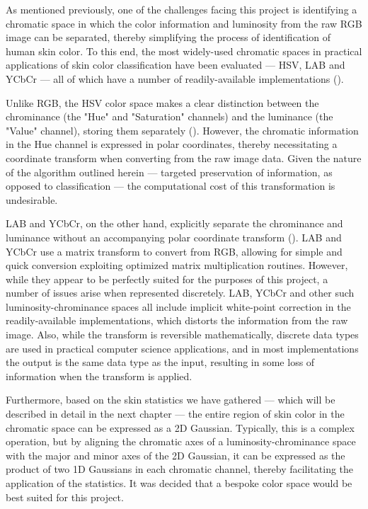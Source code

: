 As mentioned previously, one of the challenges facing this project is identifying a chromatic space in which the color information and luminosity from the raw RGB image can be separated, thereby simplifying the process of identification of human skin color. To this end, the most widely-used chromatic spaces in practical applications of skin color classification have been evaluated --- HSV, LAB and YCbCr --- all of which have a number of readily-available implementations (\cite{Vezhnevets2003,Zarit1999a,Yang1997a,Brand2000a,Sigal2000a,Chai2000a,Phung2002a}).

Unlike RGB, the HSV color space makes a clear distinction between the chrominance (the "Hue" and "Saturation" channels) and the luminance (the "Value" channel), storing them separately (\cite{Vezhnevets2003,Sigal2000a}). However, the chromatic information in the Hue channel is expressed in polar coordinates, thereby necessitating a coordinate transform when converting from the raw image data. Given the nature of the algorithm outlined herein --- targeted preservation of information, as opposed to classification ---  the computational cost of this transformation is undesirable.

LAB and YCbCr, on the other hand, explicitly separate the chrominance and luminance without an accompanying polar coordinate transform (\cite{Vezhnevets2003,Poynton1997,Phung2002a}). LAB and YCbCr use a matrix transform to convert from RGB, allowing for simple and quick conversion exploiting optimized matrix multiplication routines. However, while they appear to be perfectly suited for the purposes of this project, a number of issues arise when represented discretely. LAB, YCbCr and other such luminosity-chrominance spaces all include implicit white-point correction in the readily-available implementations, which distorts the information from the raw image. Also, while the transform is reversible mathematically, discrete data types are used in practical computer science applications, and in most implementations the output is the same data type as the input, resulting in some loss of information when the transform is applied.

Furthermore, based on the skin statistics we have gathered --- which will be described in detail in the next chapter --- the entire region of skin color in the chromatic space can be expressed as a 2D Gaussian. Typically, this is a complex operation, but by aligning the chromatic axes of a luminosity-chrominance space with the major and minor axes of the 2D Gaussian, it can be expressed as the product of two 1D Gaussians in each chromatic channel, thereby facilitating the application of the statistics. It was decided that a bespoke color space would be best suited for this project. 


